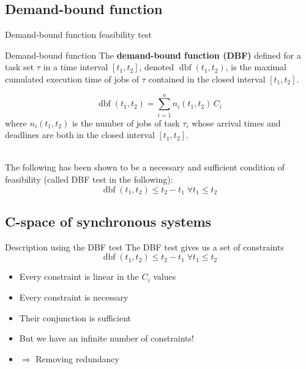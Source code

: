 \documentclass{beamer}
\newcommand{\dbf}[1]{\operatorname{dbf}(#1)}
\begin{document}
    \begin{frame}
    \end{frame}

    \subsection{Demand-bound function}

    \begin{frame}{Demand-bound function feasibility test}
        \begin{block}{Demand-bound function}
            The \textbf{demand-bound function (DBF)}
            defined for a task set $\tau$ in a time interval $[t_1, t_2]$, denoted $\dbf{t_1, t_2}$, is
            the maximal cumulated execution time of jobs of $\tau$ contained in the
            closed interval $[t_1, t_2]$.
        \end{block}
        $$\dbf{t_1, t_2} = \sum_{i=1}^{n} n_i(t_1, t_2) \, C_i$$
        where $n_i(t_1, t_2)$ is the number of jobs of task $\tau_i$ whose arrival times
        and deadlines are both in the closed interval $[t_1, t_2]$.

        ~\\

        The following has been shown to be a necessary and sufficient condition of feasibility (called DBF test in the following): $$\dbf{t_1, t_2} \leqslant t_2 - t_1 \; \forall t_1 \leq t_2$$

    \end{frame}

    \subsection{C-space of synchronous systems}

    \begin{frame}{Description using the DBF test}
    The DBF test gives us a set of constraints
    $$\dbf{t_1, t_2} \leqslant t_2 - t_1 \; \forall t_1 \leq t_2$$

    \begin{itemize}
        \item Every constraint is linear in the $C_i$ values
        \item Every constraint is necessary
        \item Their conjunction is sufficient
        \item But we have an infinite number of constraints!
        \item $\Rightarrow$ Removing redundancy
    \end{itemize}
    \end{frame}
\end{document}

